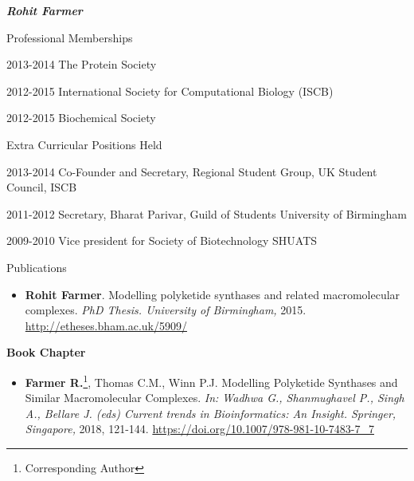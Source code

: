 \documentclass[10pt]{article}
\begin{document}
\begin{cv}{\huge \it \bfseries Rohit Farmer}
\vskip3pt
\begin{cvlist}{Professional Memberships}
	\item[2013-2014] The Protein Society
	\item[2012-2015] International Society for Computational Biology (ISCB)
	\item[2012-2015] Biochemical Society
\end{cvlist}

\vskip3pt
\begin{cvlist}{Extra Curricular Positions Held}
	\item[2013-2014] Co-Founder and Secretary, Regional Student Group, UK \hfill Student Council, ISCB
	\item[2011-2012] Secretary, Bharat Parivar, Guild of Students \hfill University of Birmingham
	\item[2009-2010] Vice president for Society of Biotechnology \hfill SHUATS
\end{cvlist}

\renewenvironment{thebibliography}[1]{
\setlength{\topsep}{0em}
\setlength{\labelsep}{.5em}
\begin{etaremune}{
\setlength{\itemsep}{0.5em}}
}{\end{etaremune}}
\renewcommand{\bibitem}[1]{\item}

\setlength{\cvlabelsep}{0mm}
\setlength{\cvlabelwidth}{0mm}
\renewcommand{\labelitemi}{}

\vspace{1em}

\begin{cvlist}{Publications}

\item {\begin{itemize}\item{\bf Rohit Farmer}. Modelling polyketide synthases and related macromolecular complexes. \emph{PhD Thesis. University of Birmingham,} 2015. \url{http://etheses.bham.ac.uk/5909/} \end{itemize}}

\vskip3pt
\item {\textbf{Book Chapter}}
\item {\begin{itemize}\item{\bf Farmer R.}\footnote{Corresponding Author}, Thomas C.M., Winn P.J. Modelling Polyketide Synthases and Similar Macromolecular Complexes. \emph{In: Wadhwa G., Shanmughavel P., Singh A., Bellare J. (eds) Current trends in Bioinformatics: An Insight. Springer, Singapore,} 2018, 121-144. \url{https://doi.org/10.1007/978-981-10-7483-7_7} \end{itemize}}


\end{cvlist}
\end{cv}
\end{document}
